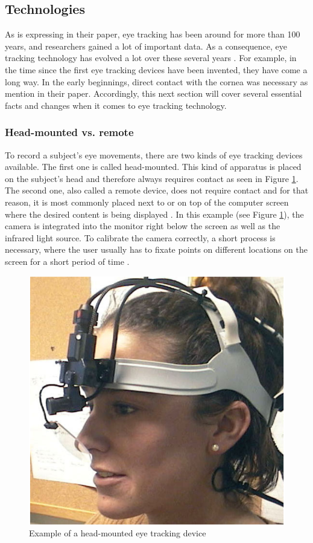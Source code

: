 \subsection{Technologies}
\label{subsection:Technologies}
As \textcite[]{biedert2010eyebook} is expressing in their paper, eye tracking has been around for more than 100 years, and researchers gained a lot of important data. As a consequence, eye tracking technology has evolved a lot over these several years \autocite[]{poole2006eye}.
For example, in the time since the first eye tracking devices have been invented, they have come a long way. In the early beginnings, direct contact with the cornea was necessary as \textcite[]{jacob2003eye} mention in their paper.
Accordingly, this next section will cover several essential facts and changes when it comes to eye tracking technology.

\subsubsection{Head-mounted vs. remote}
To record a subject's eye movements, there are two kinds of eye tracking devices available. The first one is called head-mounted. This kind of apparatus is placed on the subject's head and therefore always requires contact as seen in Figure \ref{figure:HeadMounted}. 
The second one, also called a remote device, does not require contact and for that reason, it is most commonly placed next to or on top of the computer screen where the desired content is being displayed \autocite[]{jacob2003eye, schiessl2003eye}. In this example (see Figure \ref{figure:HeadMounted}), the camera is integrated into the monitor right below the screen as well as the infrared light source. 
To calibrate the camera correctly, a short process is necessary, where the user usually has to fixate points on different locations on the screen for a short period of time \autocite{biedert2010eyebook}.

\begin{figure}[!ht]
    \centering
    \includegraphics[width=0.75\linewidth]{images/headmounted_goldberg2002eye.png}
    \caption{
        Example of a head-mounted eye tracking device \autocite[12]{goldberg2002eye}
    }
    \label{figure:HeadMounted}
\end{figure}

